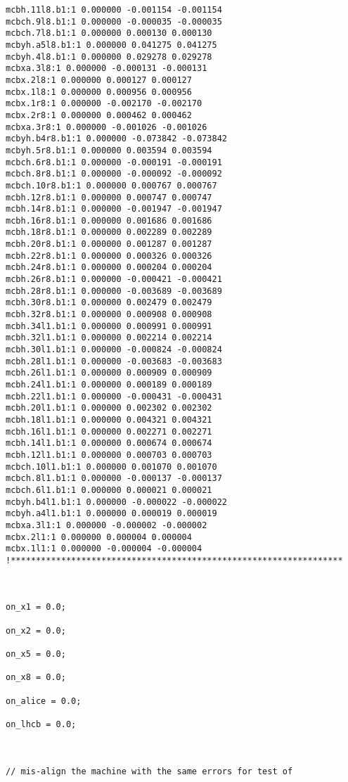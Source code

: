 \begin{verbatim}
mcbh.11l8.b1:1 0.000000 -0.001154 -0.001154
mcbch.9l8.b1:1 0.000000 -0.000035 -0.000035
mcbch.7l8.b1:1 0.000000 0.000130 0.000130
mcbyh.a5l8.b1:1 0.000000 0.041275 0.041275
mcbyh.4l8.b1:1 0.000000 0.029278 0.029278
mcbxa.3l8:1 0.000000 -0.000131 -0.000131
mcbx.2l8:1 0.000000 0.000127 0.000127
mcbx.1l8:1 0.000000 0.000956 0.000956
mcbx.1r8:1 0.000000 -0.002170 -0.002170
mcbx.2r8:1 0.000000 0.000462 0.000462
mcbxa.3r8:1 0.000000 -0.001026 -0.001026
mcbyh.b4r8.b1:1 0.000000 -0.073842 -0.073842
mcbyh.5r8.b1:1 0.000000 0.003594 0.003594
mcbch.6r8.b1:1 0.000000 -0.000191 -0.000191
mcbch.8r8.b1:1 0.000000 -0.000092 -0.000092
mcbch.10r8.b1:1 0.000000 0.000767 0.000767
mcbh.12r8.b1:1 0.000000 0.000747 0.000747
mcbh.14r8.b1:1 0.000000 -0.001947 -0.001947
mcbh.16r8.b1:1 0.000000 0.001686 0.001686
mcbh.18r8.b1:1 0.000000 0.002289 0.002289
mcbh.20r8.b1:1 0.000000 0.001287 0.001287
mcbh.22r8.b1:1 0.000000 0.000326 0.000326
mcbh.24r8.b1:1 0.000000 0.000204 0.000204
mcbh.26r8.b1:1 0.000000 -0.000421 -0.000421
mcbh.28r8.b1:1 0.000000 -0.003689 -0.003689
mcbh.30r8.b1:1 0.000000 0.002479 0.002479
mcbh.32r8.b1:1 0.000000 0.000908 0.000908
mcbh.34l1.b1:1 0.000000 0.000991 0.000991
mcbh.32l1.b1:1 0.000000 0.002214 0.002214
mcbh.30l1.b1:1 0.000000 -0.000824 -0.000824
mcbh.28l1.b1:1 0.000000 -0.003683 -0.003683
mcbh.26l1.b1:1 0.000000 0.000909 0.000909
mcbh.24l1.b1:1 0.000000 0.000189 0.000189
mcbh.22l1.b1:1 0.000000 -0.000431 -0.000431
mcbh.20l1.b1:1 0.000000 0.002302 0.002302
mcbh.18l1.b1:1 0.000000 0.004321 0.004321
mcbh.16l1.b1:1 0.000000 0.002271 0.002271
mcbh.14l1.b1:1 0.000000 0.000674 0.000674
mcbh.12l1.b1:1 0.000000 0.000703 0.000703
mcbch.10l1.b1:1 0.000000 0.001070 0.001070
mcbch.8l1.b1:1 0.000000 -0.000137 -0.000137
mcbch.6l1.b1:1 0.000000 0.000021 0.000021
mcbyh.b4l1.b1:1 0.000000 -0.000022 -0.000022
mcbyh.a4l1.b1:1 0.000000 0.000019 0.000019
mcbxa.3l1:1 0.000000 -0.000002 -0.000002
mcbx.2l1:1 0.000000 0.000004 0.000004
mcbx.1l1:1 0.000000 -0.000004 -0.000004
!******************************************************************



on_x1 = 0.0;

on_x2 = 0.0;

on_x5 = 0.0;

on_x8 = 0.0;

on_alice = 0.0;

on_lhcb = 0.0;



// mis-align the machine with the same errors for test of 


\end{verbatim}
